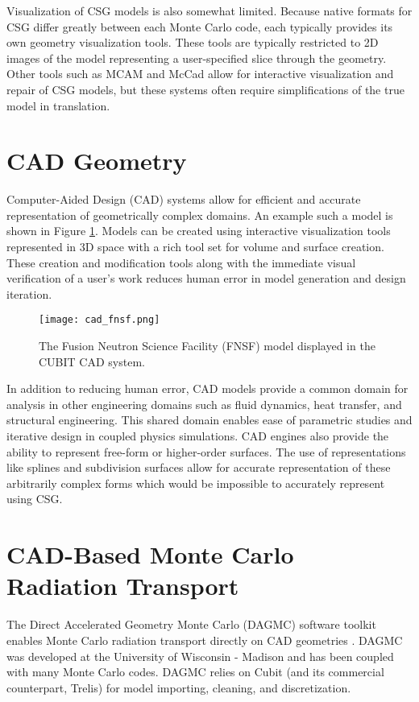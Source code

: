Visualization of CSG models is also somewhat limited. Because native formats for
CSG differ greatly between each Monte Carlo code, each typically provides its
own geometry visualization tools. These tools are typically restricted to 2D
images of the model representing a user-specified slice through the
geometry. Other tools such as MCAM \cite{Liu_2005} and McCad
\cite{Tsigetamirat_2008} allow for interactive visualization and repair of CSG
models, but these systems often require simplifications of the true model in
translation.

\section{CAD Geometry}

Computer-Aided Design (CAD) systems allow for efficient and accurate
representation of geometrically complex domains. An example such a model is
shown in Figure \ref{fig:cad_fnsf}. Models can be created using interactive
visualization tools represented in 3D space with a rich tool set for volume and
surface creation. These creation and modification tools along with the immediate
visual verification of a user's work reduces human error in model generation and
design iteration.

\begin{figure}[H]
  \centering
  \texttt{[image: cad\_fnsf.png]}
  \caption[CAD image of the FNSF facility.]{The Fusion Neutron Science Facility (FNSF)\cite{Kessel_2017} model
    displayed in the CUBIT \cite{Blacker_1994} CAD system.}
  \label{fig:cad_fnsf}
\end{figure}

In addition to reducing human error, CAD models provide a common domain for
analysis in other engineering domains such as fluid dynamics, heat transfer, and
structural engineering. This shared domain enables ease of parametric studies
and iterative design in coupled physics simulations. CAD engines also provide
the ability to represent free-form or higher-order surfaces. The use of
representations like splines and subdivision surfaces allow for accurate
representation of these arbitrarily complex forms which would be impossible to
accurately represent using CSG.

\section{CAD-Based Monte Carlo Radiation Transport}

The Direct Accelerated Geometry Monte Carlo (DAGMC) software toolkit enables
Monte Carlo radiation transport directly on CAD geometries
\cite{Tautges_2009}. DAGMC was developed at the University of Wisconsin -
Madison and has been coupled with many Monte Carlo codes. DAGMC relies on
Cubit\cite{Blacker_1994} (and its commercial counterpart,
Trelis\cite{Trelis_2018}) for model importing, cleaning, and discretization.

